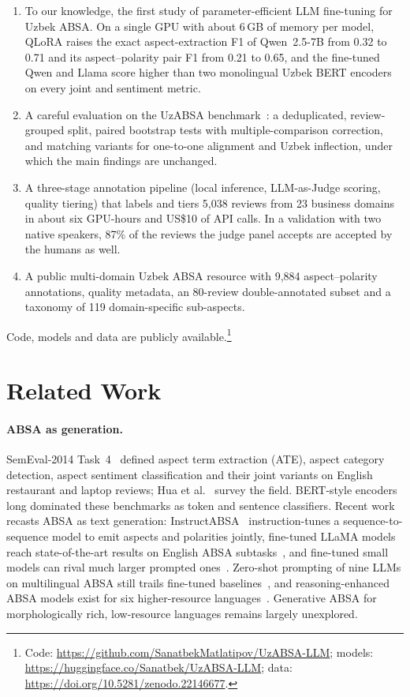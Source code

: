 \documentclass[runningheads]{llncs}
\begin{document}
\begin{enumerate}
\item To our knowledge, the first study of parameter-efficient LLM fine-tuning for Uzbek ABSA. On a single GPU with about 6\,GB of memory per model, QLoRA raises the exact aspect-extraction F1 of Qwen~2.5-7B from 0.32 to 0.71 and its aspect--polarity pair F1 from 0.21 to 0.65, and the fine-tuned Qwen and Llama score higher than two monolingual Uzbek BERT encoders on every joint and sentiment metric.
\item A careful evaluation on the UzABSA benchmark~\cite{matlatipov-etal-2024-uzabsa}: a deduplicated, review-grouped split, paired bootstrap tests with multiple-comparison correction, and matching variants for one-to-one alignment and Uzbek inflection, under which the main findings are unchanged.
\item A three-stage annotation pipeline (local inference, LLM-as-Judge scoring, quality tiering) that labels and tiers 5,038 reviews from 23 business domains in about six GPU-hours and US\$10 of API calls. In a validation with two native speakers, 87\% of the reviews the judge panel accepts are accepted by the humans as well.
\item A public multi-domain Uzbek ABSA resource with 9,884 aspect--polarity annotations, quality metadata, an 80-review double-annotated subset and a taxonomy of 119 domain-specific sub-aspects.
\end{enumerate}

\noindent Code, models and data are publicly available.\footnote{Code: \url{https://github.com/SanatbekMatlatipov/UzABSA-LLM}; models: \url{https://huggingface.co/Sanatbek/UzABSA-LLM}; data: \url{https://doi.org/10.5281/zenodo.22146677}.}

\section{Related Work}
\label{sec:related}

\paragraph{ABSA as generation.} SemEval-2014 Task~4~\cite{pontiki-etal-2014-semeval} defined aspect term extraction (ATE), aspect category detection, aspect sentiment classification and their joint variants on English restaurant and laptop reviews; Hua et al.~\cite{Hua2024} survey the field. BERT-style encoders long dominated these benchmarks as token and sentence classifiers. Recent work recasts ABSA as text generation: InstructABSA~\cite{scaria-etal-2024-instructabsa} instruction-tunes a sequence-to-sequence model to emit aspects and polarities jointly, fine-tuned LLaMA models reach state-of-the-art results on English ABSA subtasks~\cite{smid-etal-2024-llama}, and fine-tuned small models can rival much larger prompted ones~\cite{simmering2023llmabsa}. Zero-shot prompting of nine LLMs on multilingual ABSA still trails fine-tuned baselines~\cite{Wu2025}, and reasoning-enhanced ABSA models exist for six higher-resource languages~\cite{liskowski2026arctic}. Generative ABSA for morphologically rich, low-resource languages remains largely unexplored.
\end{document}
